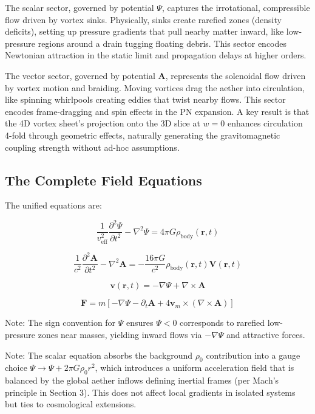 \documentclass{article}
\begin{document}
The scalar sector, governed by potential $\Psi$, captures the irrotational, compressible flow driven by vortex sinks. Physically, sinks create rarefied zones (density deficits), setting up pressure gradients that pull nearby matter inward, like low-pressure regions around a drain tugging floating debris. This sector encodes Newtonian attraction in the static limit and propagation delays at higher orders.

The vector sector, governed by potential $\mathbf{A}$, represents the solenoidal flow driven by vortex motion and braiding. Moving vortices drag the aether into circulation, like spinning whirlpools creating eddies that twist nearby flows. This sector encodes frame-dragging and spin effects in the PN expansion. A key result is that the 4D vortex sheet's projection onto the 3D slice at $w=0$ enhances circulation 4-fold through geometric effects, naturally generating the gravitomagnetic coupling strength without ad-hoc assumptions.

\subsection{The Complete Field Equations}

The unified equations are:

\[
\boxed{\frac{1}{v_{\text{eff}}^2} \frac{\partial^2 \Psi}{\partial t^2} - \nabla^2 \Psi = 4\pi G \rho_{\text{body}}(\mathbf{r}, t)}
\]

\[
\boxed{\frac{1}{c^2} \frac{\partial^2 \mathbf{A}}{\partial t^2} - \nabla^2 \mathbf{A} = -\frac{16\pi G}{c^2} \rho_{\text{body}}(\mathbf{r}, t) \mathbf{V}(\mathbf{r}, t)}
\]

\[
\boxed{\mathbf{v}(\mathbf{r}, t) = -\nabla \Psi + \nabla \times \mathbf{A}}
\]

\[
\boxed{\mathbf{F} = m \left[ -\nabla \Psi - \partial_t \mathbf{A} + 4 \mathbf{v}_m \times (\nabla \times \mathbf{A}) \right]}
\]

Note: The sign convention for $\Psi$ ensures $\Psi < 0$ corresponds to rarefied low-pressure zones near masses, yielding inward flows via $-\nabla \Psi$ and attractive forces.

Note: The scalar equation absorbs the background $\rho_0$ contribution into a gauge choice $\Psi \to \Psi + 2\pi G \rho_0 r^2$, which introduces a uniform acceleration field that is balanced by the global aether inflows defining inertial frames (per Mach's principle in Section 3). This does not affect local gradients in isolated systems but ties to cosmological extensions.
\end{document}
